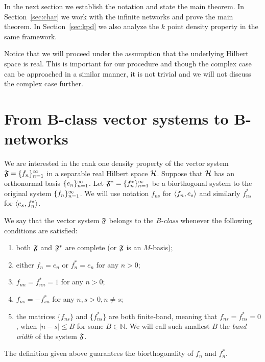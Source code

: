 \documentclass[12pt,oneside,a4paper]{amsart}
\begin{document}
  In the next section we establish the notation and state the main theorem.
  In Section~\ref{sec:char} we work with the infinite networks and prove the main theorem.
  In Section~\ref{sec:kpd} we also analyze the $k$ point density property in the same framework.

  Notice that we will proceed under the assumption that the underlying Hilbert space is real.
  This is important for our procedure and though the complex case can be approached in
    a similar manner, it is not trivial and we will not discuss the complex case further.
\bigskip
\section{From B-class vector systems to B-networks}
    \label{sec:refor}
    \label{fsys2graphs}
    We are interested in the rank one density property of the vector system $\fsys = \seq{f}$
      in a separable real Hilbert space $\cal{H}$.
    Suppose that $\cal{H}$ has an orthonormal basis $\seq{e}$.
    Let $\fstarsys = \{f_n^{*}\}_{n=1}^\infty$ be a biorthogonal system to the original system $\seq{f}$.
    We will use notation $f_{ns}$ for $\inner{f_n}{e_s}$ and similarly $f^*_{ns}$ for $\inner{e_s}{f^*_n}$.
    \begin{definition}
      We say that the vector system $\fsys$ belongs to the \emph{B-class} whenever the following conditions are satisfied:
      \begin{enumerate}[label=\textbf{C\arabic*}]
        \item \label{c1} both $\fsys$ and $\fstarsys$ are complete (or $\fsys$ is an $M$-basis);
        \item \label{c2} either $f_n = e_n$ or $f^*_n = e_n$ for any $n > 0$;
        \item \label{c3} $f_{nn} = f^*_{nn} = 1$ for any $n > 0$;
        \item \label{c4} $f_{ns} = -f^*_{sn}$ for any $n, s > 0, n \neq s$;
        \item \label{c5} the matrices $\{f_{ns}\}$ and $\{f^*_{ns}\}$ are both finite-band,
            meaning that $f_{ns} = f^*_{ns} = 0$, when $\lvert n - s \rvert \leq B$ for some $B \in \mathbb{N}$.
          We will call such smallest $B$ the \emph{band width} of the system $\fsys$.
      \end{enumerate}
    \end{definition}
    \begin{prop}
      The definition given above guarantees the biorthogonality of $f_n$ and $f^*_n$.
    \end{prop}
\end{document}

